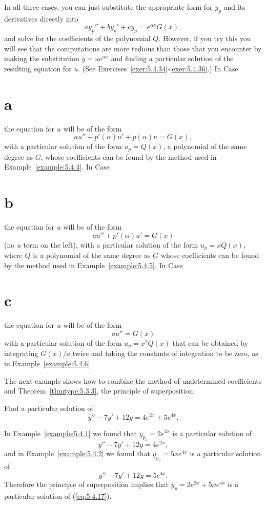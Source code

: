 In all three cases, you can just substitute the appropriate form for $y_{p}$ and its derivatives
directly into
\[
  ay_{p}''+by_{p}'+cy_{p}=e^{\alpha x}G(x),
\]
and solve for the coefficients of the polynomial $Q$. However, if you try this you will see that the
computations are more tedious than those that you encounter by making the substitution
$y=ue^{\alpha x}$ and finding a particular solution of the resulting equation for $u$. (See
Exercises~\ref{exer:5.4.34}-\ref{exer:5.4.36}.) In Case~\part{a} the equation for $u$ will be of the
form
\[
  au''+p'(\alpha)u'+p(\alpha)u=G(x),
\]
with a particular solution of the form $u_{p}=Q(x)$, a polynomial of the same degree as $G$, whose
coefficients can be found by the method used in Example~\ref{example:5.4.4}. In Case~\part{b} the
equation for $u$ will be of the form
\[
  au''+p'(\alpha)u'=G(x)
\]
(no $u$ term on the left), with a particular solution of the form $u_{p}=xQ(x)$, where $Q$ is a
polynomial of the same degree as $G$ whose coefficients can be found by the method used in
Example~\ref{example:5.4.5}. In Case~\part{c} the equation for $u$ will be of the form
\[
  au''=G(x)
\]
with a particular solution of the form $u_{p}=x^{2}Q(x)$ that can be obtained by integrating
$G(x)/a$ twice and taking the constants of integration to be zero, as in
Example~\ref{example:5.4.6}.


\noindent
The next example shows how to combine the method of undetermined coefficients and
Theorem~\ref{thmtype:5.3.3}, the principle of superposition.

\begin{example}
  \label{example:5.4.7} \rm Find a particular solution of
  \begin{equation}
    \label{eq:5.4.17}y''-7y'+12y=4e^{2x}+5e^{4x}.
  \end{equation}
\end{example}

\begin{examplesolution}
\solution In Example~\ref{example:5.4.1} we found that $y_{p_{1}}=2e^{2x}$ is a particular solution
of
\[
  y''-7y'+12y=4e^{2x},
\]
and in Example~\ref{example:5.4.2} we found that $y_{p_{2}}=5xe^{4x}$ is a particular solution of
\[
  y''-7y'+12y=5e^{4x}.
\]
Therefore the principle of superposition implies that $y_{p}=2e^{2x}+5xe^{4x}$ is a particular
solution of (\ref{eq:5.4.17}).
\end{examplesolution}


